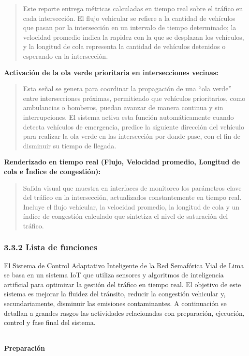 \documentclass[12pt,a4paper,oneside]{report}
\providecommand{\texorpdfstring}[2]{#1}
\begin{document}
\begin{quote}
Este reporte entrega métricas calculadas en tiempo real sobre el tráfico en cada intersección. El flujo vehicular se refiere a la cantidad de vehículos que pasan por la intersección en un intervalo de tiempo determinado; la velocidad promedio indica la rapidez con la que se desplazan los vehículos, y la longitud de cola representa la cantidad de vehículos detenidos o esperando en la intersección.
\end{quote}

\textbf{Activación de la ola verde prioritaria en intersecciones vecinas:}

\begin{quote}
Esta señal se genera para coordinar la propagación de una ``ola verde'' entre intersecciones próximas, permitiendo que vehículos prioritarios, como ambulancias o bomberos, puedan avanzar de manera continua y sin interrupciones. El sistema activa esta función automáticamente cuando detecta vehículos de emergencia, predice la siguiente dirección del vehículo para realizar la ola verde en las intersección por donde pase, con el fin de disminuir su tiempo de llegada.
\end{quote}

\textbf{Renderizado en tiempo real (Flujo, Velocidad promedio, Longitud de cola e Índice de congestión):}

\begin{quote}
Salida visual que muestra en interfaces de monitoreo los parámetros clave del tráfico en la intersección, actualizados constantemente en tiempo real. Incluye el flujo vehicular, la velocidad promedio, la longitud de cola y un índice de congestión calculado que sintetiza el nivel de saturación del tráfico.
\end{quote}

\subsubsection{\texorpdfstring{3.3.2 Lista de funciones\\
}{3.3.2 Lista de funciones }}\label{lista-de-funciones}

El Sistema de Control Adaptativo Inteligente de la Red Semafórica Vial de Lima se basa en un sistema IoT que utiliza sensores y algoritmos de inteligencia artificial para optimizar la gestión del tráfico en tiempo real. El objetivo de este sistema es mejorar la fluidez del tránsito, reducir la congestión vehicular y, secundariamente, disminuir las emisiones contaminantes. A continuación se detallan a grandes rasgos las actividades relacionadas con preparación, ejecución, control y fase final del sistema.\\
\strut \\
\textbf{Preparación}
\end{document}
